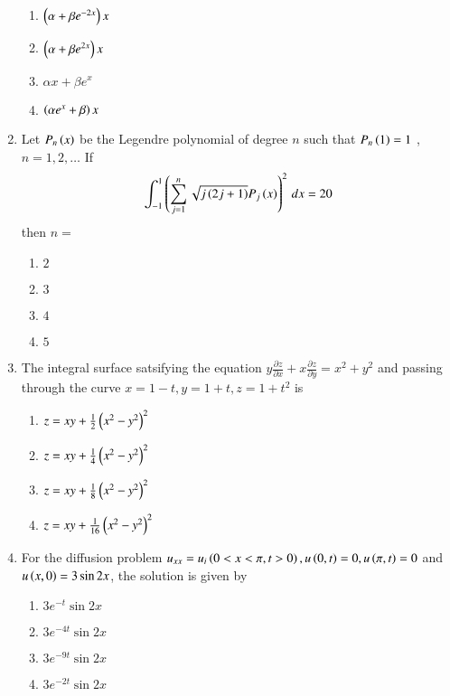 \documentclass[journal,onecolumn]{IEEEtran}
\theoremstyle{remark}
\begin{document}
\begin{enumerate}
	\begin{enumerate}
		\item $\left(\alpha + \beta e^{-2x}\right)x$
		\item $\left(\alpha + \beta e^{2x}\right)x$
		\item $\alpha x + \beta e^{x}$
		\item $\left(\alpha e^{x} + \beta\right)x$
	\end{enumerate}


    \item Let $P_n\left(x\right)$ be the Legendre polynomial of degree $n$ such that $P_n\left(1\right) = 1$ , $n = 1, 2, \dots$ If
	\begin{align*}
		\int_{-1}^{1} \left(\sum_{j = 1}^{n} \sqrt{j\left(2j + 1\right)} P_j\left(x\right)\right)^2 \, dx = 20
	\end{align*}
	then $n = $

	\begin{enumerate}
		\item $2$
		\item $3$
		\item $4$
		\item $5$
	\end{enumerate}


    \item The integral surface satsifying the equation $y\frac{\partial{z}}{\partial{x}} + x\frac{\partial{z}}{\partial{y}} = x^2 + y^2$ and passing through the curve $x = 1 - t, y = 1 + t, z = 1 + t^2$ is

	\begin{enumerate}
		\item $z = xy + \frac{1}{2}\left(x^2 - y^2\right)^2$
		\item $z = xy + \frac{1}{4}\left(x^2 - y^2\right)^2$
		\item $z = xy + \frac{1}{8}\left(x^2 - y^2\right)^2$
		\item $z = xy + \frac{1}{16}\left(x^2 - y^2\right)^2$
	\end{enumerate}


    \item For the diffusion problem $u_{xx} = u_{i} \left(0 < x < \pi, t > 0\right), u\left(0, t\right) = 0, u\left(\pi, t\right) = 0$ and $u\left(x, 0\right) = 3\sin{2x}$, the solution is given by

	\begin{enumerate}
		\item $3e^{-t}\sin{2x}$
		\item $3e^{-4t}\sin{2x}$
		\item $3e^{-9t}\sin{2x}$
		\item $3e^{-2t}\sin{2x}$
	\end{enumerate}

\end{enumerate}
\end{document}
